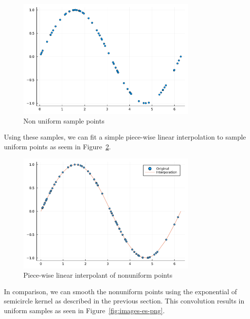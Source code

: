 \begin{figure}[htpb!]
    \centering
    \includegraphics[width=0.8\textwidth]{images/nu_points.png}
    \caption{Non uniform sample points}
    \label{fig:nu_points}
\end{figure}

Using these samples, we can fit a simple piece-wise linear interpolation to sample uniform points as seem in Figure~\ref{fig:images-interp-png}.

\begin{figure}[htpb!]
    \centering
    \includegraphics[width=0.8\textwidth]{images/interp.png}
    \caption{Piece-wise linear interpolant of nonuniform points}
    \label{fig:images-interp-png}
\end{figure}

In comparison, we can smooth the nonuniform points using the exponential of semicircle kernel as described in the previous section.
This convolution results in uniform samples as seen in Figure~\ref{fig:images-es-png}.

